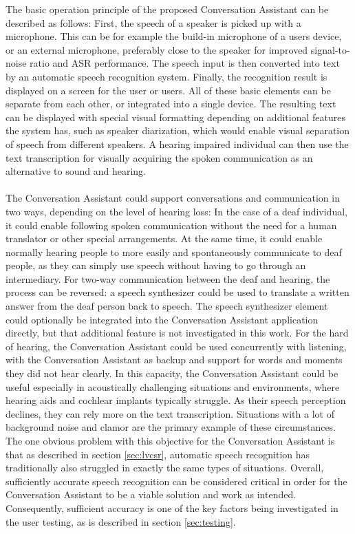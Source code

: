 \documentclass[english, 12pt, a4paper, pdftex, elec, utf8]{aaltothesis}
\begin{document}
The basic operation principle of the proposed Conversation Assistant can be described as follows: First, the speech of a speaker is picked up with a microphone. This can be for example the build-in microphone of a users device, or an external microphone, preferably close to the speaker for improved signal-to-noise ratio and ASR performance. The speech input is then converted into text by an automatic speech recognition system. Finally, the recognition result is displayed on a screen for the user or users. All of these basic elements can be separate from each other, or integrated into a single device. The resulting text can be displayed with special visual formatting depending on additional features the system has, such as speaker diarization, which would enable visual separation of speech from different speakers. A hearing impaired individual can then use the text transcription for visually acquiring the spoken communication as an alternative to sound and hearing. \\\\
The Conversation Assistant could support conversations and communication in two ways, depending on the level of hearing loss: In the case of a deaf individual, it could enable following spoken communication without the need for a human translator or other special arrangements. At the same time, it could enable normally hearing people to more easily and spontaneously communicate to deaf people, as they can simply use speech without having to go through an intermediary. For two-way communication between the deaf and hearing, the process can be reversed: a speech synthesizer could be used to translate a written answer from the deaf person back to speech. The speech synthesizer element could optionally be integrated into the Conversation Assistant application directly, but that additional feature is not investigated in this work. For the hard of hearing, the Conversation Assistant could be used concurrently with listening, with the Conversation Assistant as backup and support for words and moments they did not hear clearly. In this capacity, the Conversation Assistant could be useful especially in acoustically challenging situations and environments, where hearing aids and cochlear implants typically struggle. As their speech perception declines, they can rely more on the text transcription. Situations with a lot of background noise and clamor are the primary example of these circumstances. The one obvious problem with this objective for the Conversation Assistant is that as described in section \ref{sec:lvcsr}, automatic speech recognition has traditionally also struggled in exactly the same types of situations. Overall, sufficiently accurate speech recognition can be considered critical in order for the Conversation Assistant to be a viable solution and work as intended. Consequently, sufficient accuracy is one of the key factors being investigated in the user testing, as is described in section \ref{sec:testing}.
\end{document}
